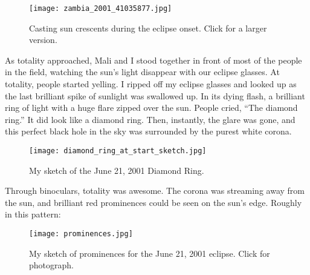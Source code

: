 
\begin{SCfigure}
\centering
\texttt{[image: zambia\_2001\_41035877.jpg]}
\caption{Casting sun crescents during the eclipse onset. Click for a
larger version.}
\label{fig:8074X1}
\end{SCfigure}

As totality approached, Mali and I stood together in front of most of
the people in the field, watching the sun's light disappear with our
eclipse glasses. At totality, people started yelling. I ripped off my
eclipse glasses and looked up as the last brilliant spike of sunlight
was swallowed up. In its dying flash, a brilliant ring of light with a
huge flare zipped over the sun. People cried, ``The diamond ring.'' It
did look like a diamond ring. Then, instantly, the glare was gone, and
this perfect black hole in the sky was surrounded by the purest white
corona.


\begin{SCfigure}
\centering
\texttt{[image: diamond\_ring\_at\_start\_sketch.jpg]}
\caption{My sketch of the June 21, 2001 Diamond Ring.}
\label{fig:8074X2}
\end{SCfigure}

Through binoculars, totality was awesome. The corona was streaming away
from the sun, and brilliant red prominences could be seen on the sun's
edge. Roughly in this pattern:


\begin{SCfigure}[1][!h]
\centering
\texttt{[image: prominences.jpg]}
\caption{My sketch of prominences for the June 21, 2001 eclipse. Click
for photograph.}
\label{fig:8074X3}
\end{SCfigure}

